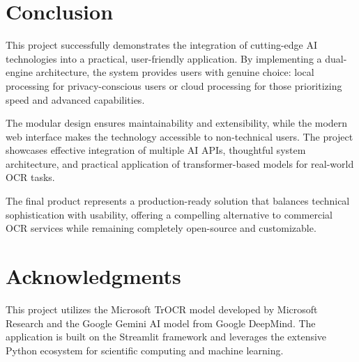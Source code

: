 \documentclass[12pt,a4paper]{article}
\begin{document}
\section{Conclusion}

This project successfully demonstrates the integration of cutting-edge AI technologies into a practical, user-friendly application. By implementing a dual-engine architecture, the system provides users with genuine choice: local processing for privacy-conscious users or cloud processing for those prioritizing speed and advanced capabilities.

The modular design ensures maintainability and extensibility, while the modern web interface makes the technology accessible to non-technical users. The project showcases effective integration of multiple AI APIs, thoughtful system architecture, and practical application of transformer-based models for real-world OCR tasks.

The final product represents a production-ready solution that balances technical sophistication with usability, offering a compelling alternative to commercial OCR services while remaining completely open-source and customizable.

\section*{Acknowledgments}

This project utilizes the Microsoft TrOCR model developed by Microsoft Research and the Google Gemini AI model from Google DeepMind. The application is built on the Streamlit framework and leverages the extensive Python ecosystem for scientific computing and machine learning.
\end{document}
